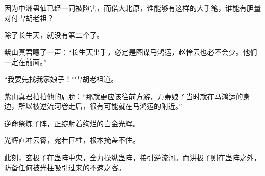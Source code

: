 \begin{this_body}
因为中洲蛊仙已经一同被陷害，而偌大北原，谁能够有这样的大手笔，谁能有胆量对付雪胡老祖？

除了长生天，就没有第二个了。

紫山真君嗯了一声：“长生天出手，必定是图谋马鸿运，赵怜云也必不会少。他们一定在前面。”

“我要先找我家娘子！”雪胡老祖道。

紫山真君拍拍他的肩膀：“那就更应该往前方游，万寿娘子当时就在马鸿运的身边，所以被逆流河卷走后，很有可能就在马鸿运的附近。”

逆命祭炼子阵，正绽射着绚烂的白金光辉。

光辉直冲云霄，宛若巨柱，根本掩盖不住。

此刻，玄极子在蛊阵中央，全力操纵蛊阵，接引逆流河。而洪极子则在蛊阵之外，防备任何被光柱吸引过来的不速之客。

\end{this_body}

